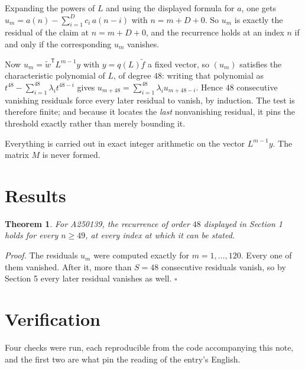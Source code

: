 \documentclass[11pt]{article}
\newtheorem{theorem}{Theorem}
\theoremstyle{definition}
\begin{document}
Expanding the powers of $L$ and using the displayed formula for $a$, one gets $u_m = a(n) - \sum_{i=1}^{D} c_i\,a(n-i)$ with $n = m + D + 0$. So $u_m$ is exactly the residual of the claim at $n = m + D + 0$, and the recurrence holds at an index $n$ if and only if the corresponding $u_m$ vanishes.

Now $u_m = \tilde w^{\mathsf T} L^{m-1} y$ with $y = q(L)\tilde f$ a fixed vector, so $(u_m)$ satisfies the characteristic polynomial of $L$, of degree $48$: writing that polynomial as $t^{48} - \sum_{i=1}^{48} \lambda_i t^{48-i}$ gives $u_{m+48} = \sum_{i=1}^{48} \lambda_i u_{m+48-i}$. Hence $48$ consecutive vanishing residuals force every later residual to vanish, by induction. The test is therefore finite; and because it locates the {\itshape last} nonvanishing residual, it pins the threshold exactly rather than merely bounding it.

Everything is carried out in exact integer arithmetic on the vector $L^{m-1}y$. The matrix $M$ is never formed.

\section{Results}

\begin{theorem} For A250139, the recurrence of order $48$ displayed in Section 1 holds for every $n \ge 49$, at every index at which it can be stated.\end{theorem}

{\itshape Proof.} The residuals $u_m$ were computed exactly for $m = 1,\dots,120$. Every one of them vanished. After it, more than $S = 48$ consecutive residuals vanish, so by Section 5 every later residual vanishes as well. $\square$

\section{Verification}

Four checks were run, each reproducible from the code accompanying this note, and the first two are what pin the reading of the entry's English.
\end{document}
